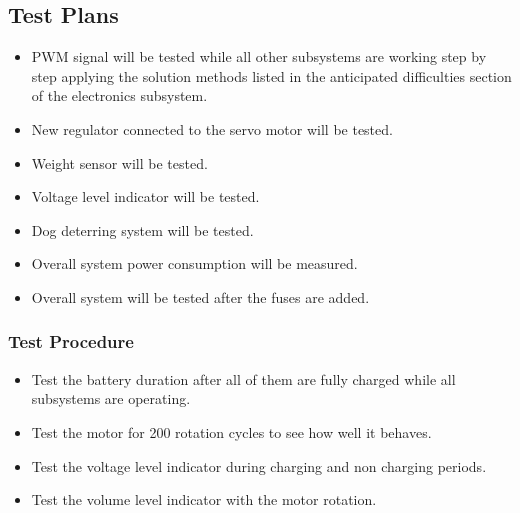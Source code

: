 \subsection{Test Plans}
\begin{itemize}
\item PWM signal will be tested while all other subsystems are working step by step applying the solution methods listed in the anticipated difficulties section of the electronics subsystem.
\item New regulator connected to the servo motor will be tested.
\item Weight sensor will be tested.
\item Voltage level indicator will be tested.
\item Dog deterring system will be tested.
\item Overall system power consumption will be measured.
\item Overall system will be tested after the fuses are added.
\end{itemize}

\subsubsection{Test Procedure}
\begin{itemize}
\item Test the battery duration after all of them are fully charged while all subsystems are operating.
\item Test the motor for 200 rotation cycles to see how well it behaves. %
\item Test the voltage level indicator during charging and non charging periods.
\item Test the volume level indicator with the motor rotation.
\end{itemize}



